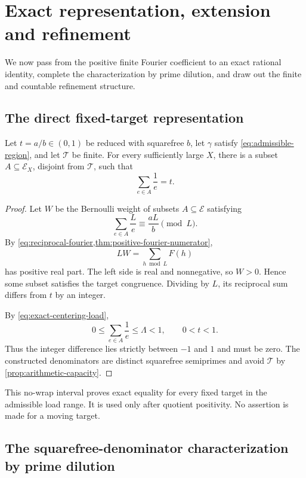 \section{Exact representation, extension and refinement}
\label{sec:exact-completion}

We now pass from the positive finite Fourier coefficient to an exact rational identity, complete the characterization by prime dilution, and draw out the finite and countable refinement structure.

\subsection{The direct fixed-target representation}

\begin{theorem}
\label{thm:avoiding-fixed-target}
Let $t=a/b\in(0,1)$ be reduced with squarefree $b$, let $\gamma$ satisfy \cref{eq:admissible-region}, and let $\mathcal T$ be finite.  For every sufficiently large $X$, there is a subset $A\subseteq\mathcal E_X$, disjoint from $\mathcal T$, such that
\[
 \sum_{e\in A}\frac1e=t.
\]
\end{theorem}

\begin{proof}
Let $W$ be the Bernoulli weight of subsets $A\subseteq\mathcal E$ satisfying
\[
 \sum_{e\in A}\frac{L}{e}\equiv\frac{aL}{b}\pmod L.
\]
By \cref{eq:reciprocal-fourier,thm:positive-fourier-numerator},
\[
 LW=\sum_{h\bmod L}F(h)
\]
has positive real part.  The left side is real and nonnegative, so $W>0$.  Hence some subset satisfies the target congruence.  Dividing by $L$, its reciprocal sum differs from $t$ by an integer.

By \cref{eq:exact-centering-load},
\[
 0\leq\sum_{e\in A}\frac1e\leq\Lambda<1,
 \qquad
 0<t<1.
\]
Thus the integer difference lies strictly between $-1$ and $1$ and must be zero.  The constructed denominators are distinct squarefree semiprimes and avoid $\mathcal T$ by \cref{prop:arithmetic-capacity}.
\end{proof}

This no-wrap interval proves exact equality for every fixed target in the admissible load range.  It is used only after quotient positivity.  No assertion is made for a moving target.

\subsection{The squarefree-denominator characterization by prime dilution}

